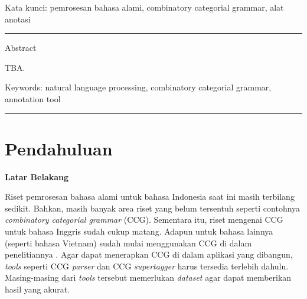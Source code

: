 {%



\bigskip
Kata kunci: pemrosesan bahasa alami, combinatory categorial grammar, alat anotasi






\noindent\rule{\textwidth}{1pt}
Abstract

TBA.

\bigskip
Keywords: natural language processing, combinatory categorial grammar, annotation tool

\noindent\rule{\textwidth}{1pt} }
   



\section{Pendahuluan}

\noindent\textbf{Latar Belakang}

Riset pemrosesan bahasa alami untuk bahasa Indonesia saat ini masih terbilang sedikit.
Bahkan, masih banyak area riset yang belum tersentuh seperti contohnya
\textit{combinatory categorial grammar} (CCG).
Sementara itu, riset mengenai CCG untuk bahasa Inggris sudah cukup matang.
Adapun untuk bahasa lainnya (seperti bahasa Vietnam) sudah mulai menggunakan CCG di dalam
penelitiannya \citep{nguyen2019vietnamese}.
Agar dapat menerapkan CCG di dalam aplikasi yang dibangun, \textit{tools} seperti
CCG \textit{parser} dan CCG \textit{supertagger} harus tersedia terlebih dahulu.
Masing-masing dari \textit{tools} tersebut memerlukan \textit{dataset} agar dapat memberikan
hasil yang akurat.

